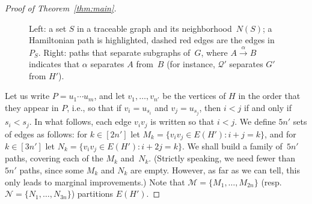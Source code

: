 \documentclass[11pt]{article}
\begin{document}
\begin{proof}[Proof of Theorem~\ref{thm:main}]
\begin{figure}
\begin{center}
\begin{minipage}{.48\textwidth}
    \end{minipage}
    \vspace*{-1.3\baselineskip}
    \caption{Left: a set $S$ in a traceable graph and its neighborhood~$N(S)$;
              a Hamiltonian path is highlighted, dashed red edges are the edges in~$P_S$. Right: paths that separate subgraphs of~$G$, where $A\stackrel{\alpha}{\to}B$ indicates that $\alpha$ separates $A$ from~$B$ (for instance, $\mathcal{Q'}$ separates $G'$ from $H'$).}\label{fig:NS}
  \end{center}
\end{figure}

Let us write \(P = u_1 \cdots u_m\),
and let \(v_1,\ldots,v_{n'}\) be the vertices of \(H\) in the order that they appear in \(P\),
i.e., so that if \(v_i = u_{s_i}\) and \(v_j = u_{s_j}\), then \(i < j\) if and only if \(s_i < s_j\).
In what follows, each edge \(v_iv_j\) is written so that \(i < j\).
We define $5n'$ sets of edges as follows:
	for \(k\in [2n']\) let \(M_k = \{v_iv_j \in E(H') : i+j = k\}\),
	and for \(k \in [3n']\) let \(N_k = \{v_iv_j \in E(H') : i+2j = k\}\).
        We shall build a family of~$5n'$ paths, covering each of the $M_k$ and~$N_k$.
        (Strictly speaking, we need fewer than $5n'$ paths, since some $M_k$ and $N_k$
        are empty.
        However, as far as we can tell, this only leads to marginal improvements.)
Note that \(\mathcal{M} = \{M_1,\ldots,M_{2n}\}\) (resp.~\(\mathcal{N} = \{N_1,\ldots,N_{3n}\}\))  partitions \(E(H')\).



\end{proof}
\end{document}
